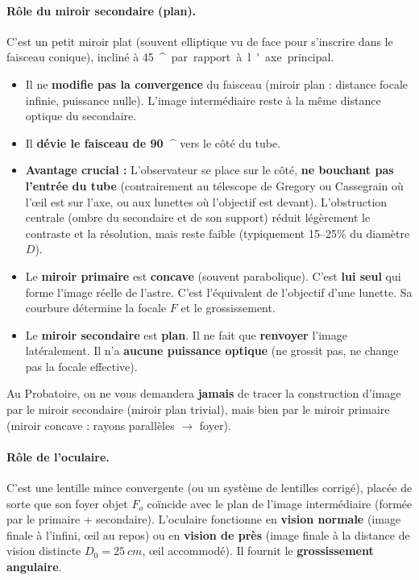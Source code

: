 \documentclass[11pt]{article}
\providecommand{\degree}{^{\circ}}
\begin{document}
\paragraph{Rôle du miroir secondaire (plan).}
C'est un petit miroir plat (souvent elliptique vu de face pour s'inscrire dans le faisceau conique), incliné à \SI{45}{\degree} par rapport à l'axe principal.
\begin{itemize}
    \item Il ne \textbf{modifie pas la convergence} du faisceau (miroir plan : distance focale infinie, puissance nulle). L'image intermédiaire reste à la même distance optique du secondaire.
    \item Il \textbf{dévie le faisceau de \SI{90}{\degree}} vers le côté du tube.
    \item \textbf{Avantage crucial :} L'observateur se place sur le côté, \textbf{ne bouchant pas l'entrée du tube} (contrairement au télescope de Gregory ou Cassegrain où l'œil est sur l'axe, ou aux lunettes où l'objectif est devant). L'obstruction centrale (ombre du secondaire et de son support) réduit légèrement le contraste et la résolution, mais reste faible (typiquement 15--25\% du diamètre $D$).
\end{itemize}

\begin{attention}
\begin{itemize}
    \item Le \textbf{miroir primaire} est \textbf{concave} (souvent parabolique). C'est \textbf{lui seul} qui forme l'image réelle de l'astre. C'est l'équivalent de l'objectif d'une lunette. Sa courbure détermine la focale $F$ et le grossissement.
    \item Le \textbf{miroir secondaire} est \textbf{plan}. Il ne fait que \textbf{renvoyer} l'image latéralement. Il n'a \textbf{aucune puissance optique} (ne grossit pas, ne change pas la focale effective).
\end{itemize}
Au Probatoire, on ne vous demandera \textbf{jamais} de tracer la construction d'image par le miroir secondaire (miroir plan trivial), mais bien par le miroir primaire (miroir concave : rayons parallèles $\to$ foyer).
\end{attention}

\paragraph{Rôle de l'oculaire.}
C'est une lentille mince convergente (ou un système de lentilles corrigé), placée de sorte que son foyer objet $F_o$ coïncide avec le plan de l'image intermédiaire (formée par le primaire + secondaire). L'oculaire fonctionne en \textbf{vision normale} (image finale à l'infini, œil au repos) ou en \textbf{vision de près} (image finale à la distance de vision distincte $D_0 = \SI{25}{cm}$, œil accommodé). Il fournit le \textbf{grossissement angulaire}.
\end{document}
